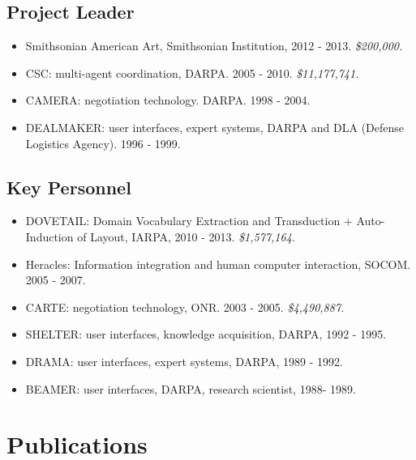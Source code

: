 \documentclass{article}
\begin{document}
\subsection*{Project Leader}
\begin{itemize}
\item Smithsonian American Art, Smithsonian Institution, 2012 - 2013.
{\em \$200,000.}

\item CSC: multi-agent coordination, DARPA. 2005 - 2010. 
{\em \$11,177,741.}

\item CAMERA: negotiation technology. DARPA. 1998 - 2004. 

\item DEALMAKER: user interfaces, expert systems, DARPA and DLA (Defense
Logistics Agency). 1996 - 1999. 
\end{itemize}

\subsection*{Key Personnel}
\begin{itemize}
\item DOVETAIL: Domain Vocabulary Extraction and Transduction + Auto-Induction of Layout, IARPA, 2010 - 2013.
{\em \$1,577,164.}

\item Heracles: Information integration and human computer
interaction, SOCOM. 2005 - 2007.

\item CARTE: negotiation technology, ONR. 2003 - 2005. 
{\em \$4,490,887.}

\item SHELTER: user interfaces, knowledge acquisition, DARPA, 1992 - 1995.

\item DRAMA: user interfaces, expert systems, DARPA, 1989 -
1992.

\item BEAMER: user interfaces, DARPA, research scientist, 1988- 1989.
\end{itemize}

\section*{Publications}
\vspace{0.3in}
\renewcommand{\refname}{\subsection*{Journal Publications}}
\vspace{-0.4in}

\renewcommand{\refname}{\subsection*{Conference Publications}}


\renewcommand{\refname}{\subsection*{Workshop, Demo and Poster Publications}}


\renewcommand{\refname}{\subsection*{Unrefereed Publications}}

\end{document}
